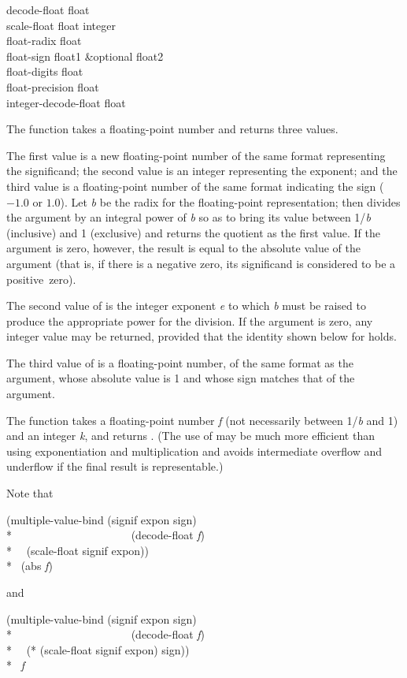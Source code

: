 \begin{defun}[Function]
decode-float float \\
scale-float float integer \\
float-radix float \\
float-sign float1 &optional float2 \\
float-digits float \\
float-precision float \\
integer-decode-float float

The function  takes a floating-point number
and returns three values.

The first value is a new floating-point number of the same format
representing the significand; the second value is an integer
representing the exponent; and the third value is a floating-point
number of the same format indicating the sign ($-1.0$ or $1.0$).
Let {\it b} be the radix for the floating-point representation;
then  divides the argument by an integral power of {\it b}
so as to bring its value between 1/{\it b} (inclusive) and 1 (exclusive)
and returns the quotient as the first value.
If the argument is zero, however, the result
is equal to the absolute value of the argument (that is, if there is a negative
zero, its significand is considered to be a positive~zero).

The second value of  is
the integer exponent {\it e} to which {\it b} must be raised
to produce the appropriate power for the division.
If the argument is zero, any integer value may be returned, provided
that the identity shown below for  holds.

The third value of  is a floating-point number,
of the same format as the argument, whose absolute value is 1
and whose sign matches that of the argument.

The function  takes a floating-point number {\it f}
(not necessarily between 1/{\it b} and 1) and
an integer {\it k}, and returns .
(The use of  may be much more efficient than using
exponentiation and multiplication and avoids intermediate
overflow and underflow if the final result is representable.)

Note that
\begin{lisp}
(multiple-value-bind (signif expon sign) \\*
~~~~~~~~~~~~~~~~~~~~~(decode-float {\it f}) \\*
~~(scale-float signif expon)) \\*
\EQ\ (abs {\it f})
\end{lisp}
and
\begin{lisp}
(multiple-value-bind (signif expon sign) \\*
~~~~~~~~~~~~~~~~~~~~~(decode-float {\it f}) \\*
~~(* (scale-float signif expon) sign)) \\*
\EQ\ {\it f}
\end{lisp}


\end{defun}
